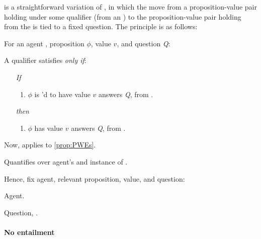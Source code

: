 \begin{note}
   is a straightforward variation of \ptivity{}, in which the move from a proposition-value pair holding under some qualifier (from an \agpe{}) to the proposition-value pair holding from the \agpe{} is tied to a fixed question.
  The principle is as follows:

  \begin{principle}[\ptivityQ{2}]
    \label{def:perspectivityQ}
    For an agent \vAgent{}, proposition \(\phi\), value \(v\), and question \emph{Q}:

    A qualifier \ptivityQV{} satisfies \ptivityQ{} \emph{only if}:

    \begin{enumerate}[noitemsep]
    \item[\emph{If}]
      \begin{enumerate}[label=\alph*., ref=(\alph*)]
      \item
        \(\phi\) is \ptivityQV{}'d to have value \(v\) answers \emph{Q}, from .
      \end{enumerate}
    \item[\emph{then}]
      \begin{enumerate}[label=\alph*., ref=(\alph*), resume]
      \item
        \(\phi\) has value \(v\) answers \emph{Q}, from .
      \end{enumerate}
    \end{enumerate}
    \vspace{-\baselineskip}
  \end{principle}
\end{note}

\begin{note}
  Now, applies to \autoref{prop:PWEs}.

  Quantifies over agent's and instance of \qzS{}.

  Hence, fix agent, relevant proposition, value, and question:

  Agent.

  Question, \qzS{}.
\end{note}

\paragraph{No entailment}

